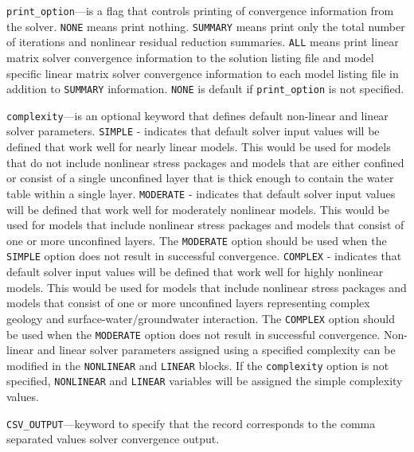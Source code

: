 
\item \texttt{print\_option}---is a flag that controls printing of convergence information from the solver.  \texttt{NONE} means print nothing. \texttt{SUMMARY} means print only the total number of iterations and nonlinear residual reduction summaries. \texttt{ALL} means print linear matrix solver convergence information to the solution listing file and model specific linear matrix solver convergence information to each model listing file in addition to \texttt{SUMMARY} information. \texttt{NONE} is default if \texttt{print\_option} is not specified.

\item \texttt{complexity}---is an optional keyword that defines default non-linear and linear solver parameters.  \texttt{SIMPLE} - indicates that default solver input values will be defined that work well for nearly linear models. This would be used for models that do not include nonlinear stress packages and models that are either confined or consist of a single unconfined layer that is thick enough to contain the water table within a single layer. \texttt{MODERATE} - indicates that default solver input values will be defined that work well for moderately nonlinear models. This would be used for models that include nonlinear stress packages and models that consist of one or more unconfined layers. The \texttt{MODERATE} option should be used when the \texttt{SIMPLE} option does not result in successful convergence.  \texttt{COMPLEX} - indicates that default solver input values will be defined that work well for highly nonlinear models. This would be used for models that include nonlinear stress packages and models that consist of one or more unconfined layers representing complex geology and surface-water/groundwater interaction. The \texttt{COMPLEX} option should be used when the \texttt{MODERATE} option does not result in successful convergence.  Non-linear and linear solver parameters assigned using a specified complexity can be modified in the \texttt{NONLINEAR} and \texttt{LINEAR} blocks. If the \texttt{complexity} option is not specified, \texttt{NONLINEAR} and \texttt{LINEAR} variables will be assigned the simple complexity values.

\item \texttt{CSV\_OUTPUT}---keyword to specify that the record corresponds to the comma separated values solver convergence output.

